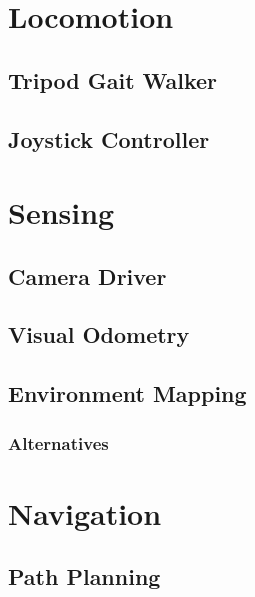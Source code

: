 \documentclass{l4proj}
\begin{document}

\chapter{Locomotion}

\section{Tripod Gait Walker}
\section{Joystick Controller}


\chapter{Sensing}

\section{Camera Driver}
\section{Visual Odometry}

\section{Environment Mapping}
\subsection{Alternatives}


\chapter{Navigation}

\section{Path Planning}

\end{document}
